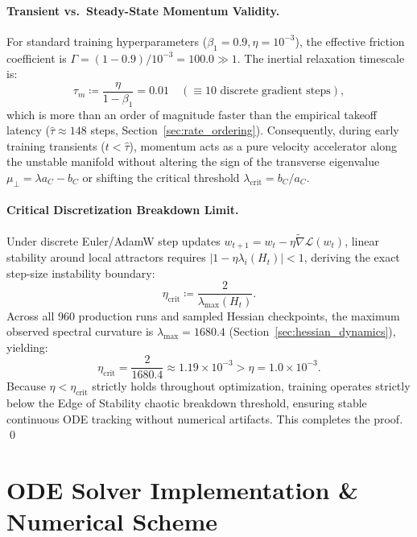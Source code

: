 \documentclass{article}
\theoremstyle{plain}
\theoremstyle{definition}
\begin{document}
\paragraph{Transient vs.\ Steady-State Momentum Validity.}
For standard training hyperparameters ($\beta_1 = 0.9, \eta = 10^{-3}$), the effective friction coefficient is $\Gamma = (1 - 0.9)/10^{-3} = 100.0 \gg 1$.
The inertial relaxation timescale is:
\begin{equation}
    \tau_m \coloneqq \frac{\eta}{1 - \beta_1} = 0.01 \quad (\equiv 10 \text{ discrete gradient steps}),
\end{equation}
which is more than an order of magnitude faster than the empirical takeoff latency ($\hat{\tau} \approx 148$ steps, Section~\ref{sec:rate_ordering}).
Consequently, during early training transients ($t < \hat{\tau}$), momentum acts as a pure velocity accelerator along the unstable manifold without altering the sign of the transverse eigenvalue $\mu_{\perp} = \lambda a_C - b_C$ or shifting the critical threshold $\lambda_{\text{crit}} = b_C / a_C$.

\paragraph{Critical Discretization Breakdown Limit.}
Under discrete Euler/AdamW step updates $w_{t+1} = w_t - \eta \tilde{\nabla} \mathcal{L}(w_t)$, linear stability around local attractors requires $|1 - \eta \lambda_i(H_t)| < 1$, deriving the exact step-size instability boundary:
\begin{equation}
    \eta_{\text{crit}} \coloneqq \frac{2}{\lambda_{\text{max}}(H_t)}.
\end{equation}
Across all 960 production runs and sampled Hessian checkpoints, the maximum observed spectral curvature is $\lambda_{\text{max}} = 1680.4$ (Section~\ref{sec:hessian_dynamics}), yielding:
\begin{equation}
    \eta_{\text{crit}} = \frac{2}{1680.4} \approx 1.19 \times 10^{-3} > \eta = 1.0 \times 10^{-3}.
\end{equation}
Because $\eta < \eta_{\text{crit}}$ strictly holds throughout optimization, training operates strictly below the Edge of Stability chaotic breakdown threshold, ensuring stable continuous ODE tracking without numerical artifacts. This completes the proof. \qed
\section{ODE Solver Implementation \& Numerical Scheme}
\label{sec:appendix_solver}
\end{document}
